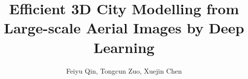\documentclass[journal]{IEEEtran}
\begin{document}
\title{Efficient 3D City Modelling from Large-scale Aerial Images by Deep Learning}
%
%
%

\author{Feiyu Qin,
       Tongcun Zuo,
       Xuejin Chen}%

\maketitle










\end{document}
